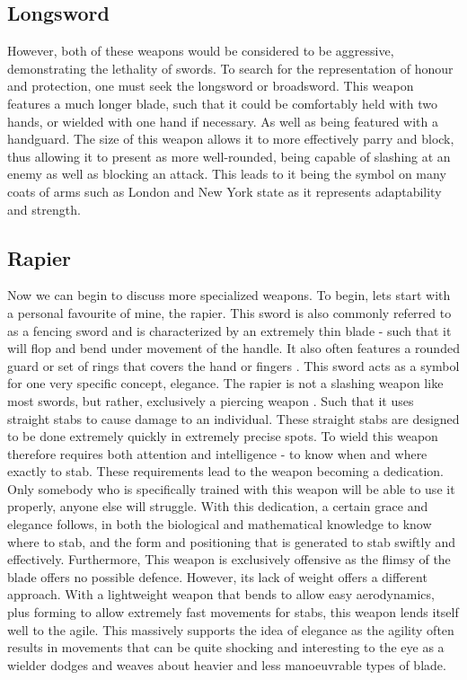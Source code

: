 \documentclass{article}
\begin{document}
\subsection{Longsword} \label{longswordSymbol}
However, both of these weapons would be considered to be aggressive, demonstrating the lethality of swords. To search for the representation of honour and protection, one must seek the longsword or broadsword. This weapon features a much longer blade, such that it could be comfortably held with two hands, or wielded with one hand if necessary. As well as being featured with a handguard. The size of this weapon allows it to more effectively parry and block, thus allowing it to present as more well-rounded, being capable of slashing at an enemy as well as blocking an attack. This leads to it being the symbol on many coats of arms such as London \parencite{fox1894book} and New York state \parencite{newyorkflag} as it represents adaptability and strength.

\subsection{Rapier}
Now we can begin to discuss more specialized weapons. To begin, lets start with a personal favourite of mine, the rapier. This sword is also commonly referred to as a fencing sword and is characterized by an extremely thin blade - such that it will flop and bend under movement of the handle. It also often features a rounded guard or set of rings that covers the hand or fingers \parencite{walker2002rapier12}. This sword acts as a symbol for one very specific concept, elegance. The rapier is not a slashing weapon like most swords, but rather, exclusively a piercing weapon \parencite{walker2002rapierNoCut}. Such that it uses straight stabs to cause damage to an individual. These straight stabs are designed to be done extremely quickly in extremely precise spots. To wield this weapon therefore requires both attention and intelligence - to know when and where exactly to stab. These requirements lead to the weapon becoming a dedication. Only somebody who is specifically trained with this weapon will be able to use it properly, anyone else will struggle. With this dedication, a certain grace and elegance follows, in both the biological and mathematical knowledge \parencite{walker2002rapier25} to know where to stab, and the form and positioning that is generated to stab swiftly and effectively. Furthermore, This weapon is exclusively offensive as the flimsy of the blade offers no possible defence. However, its lack of weight offers a different approach. With a lightweight weapon that bends to allow easy aerodynamics, plus forming to allow extremely fast movements for stabs, this weapon lends itself well to the agile. This massively supports the idea of elegance as the agility often results in movements that can be quite shocking and interesting to the eye as a wielder dodges and weaves about heavier and less manoeuvrable types of blade.
\end{document}
